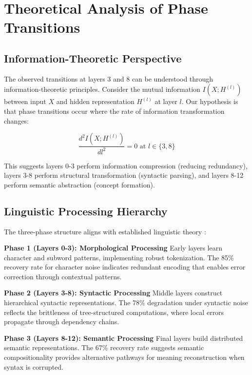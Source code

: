 \section{Theoretical Analysis of Phase Transitions}
\label{sec:theory}

\subsection{Information-Theoretic Perspective}

The observed transitions at layers 3 and 8 can be understood through information-theoretic principles. Consider the mutual information $I(X; H^{(l)})$ between input $X$ and hidden representation $H^{(l)}$ at layer $l$. Our hypothesis is that phase transitions occur where the rate of information transformation changes:

\begin{equation}
\frac{d^2I(X; H^{(l)})}{dl^2} = 0 \text{ at } l \in \{3, 8\}
\end{equation}

This suggests layers 0-3 perform information compression (reducing redundancy), layers 3-8 perform structural transformation (syntactic parsing), and layers 8-12 perform semantic abstraction (concept formation).

\subsection{Linguistic Processing Hierarchy}

The three-phase structure aligns with established linguistic theory \cite{chomsky1957syntactic}:

\textbf{Phase 1 (Layers 0-3): Morphological Processing}
Early layers learn character and subword patterns, implementing robust tokenization. The 85\% recovery rate for character noise indicates redundant encoding that enables error correction through contextual patterns.

\textbf{Phase 2 (Layers 3-8): Syntactic Processing}
Middle layers construct hierarchical syntactic representations. The 78\% degradation under syntactic noise reflects the brittleness of tree-structured computations, where local errors propagate through dependency chains.

\textbf{Phase 3 (Layers 8-12): Semantic Processing}
Final layers build distributed semantic representations. The 67\% recovery rate suggests semantic compositionality provides alternative pathways for meaning reconstruction when syntax is corrupted.

